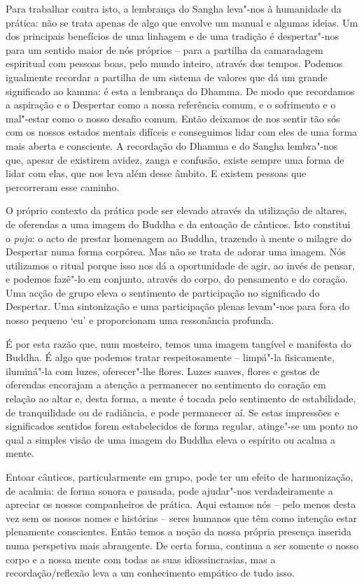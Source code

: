 Para trabalhar contra isto, a lembrança do Sangha leva"-nos à humanidade da
prática: não se trata apenas de algo que envolve um manual e algumas ideias. Um
dos principais benefícios de uma linhagem e de uma tradição é despertar"-nos para
um sentido maior de nós próprios -- para a partilha da camaradagem espiritual
com pessoas boas, pelo mundo inteiro, através dos tempos. Podemos igualmente
recordar a partilha de um sistema de valores que dá um grande significado ao
kamma: é esta a lembrança do Dhamma. De modo que recordamos a aspiração e o
Despertar como a nossa referência comum, e o sofrimento e o mal"-estar como o
nosso desafio comum. Então deixamos de nos sentir tão sós com os nossos estados
mentais difíceis e conseguimos lidar com eles de uma forma mais aberta e
consciente. A recordação do Dhamma e do Sangha lembra"-nos que, apesar de
existirem avidez, zanga e confusão, existe sempre uma forma de lidar com elas,
que nos leva além desse âmbito. E existem pessoas que percorreram esse caminho.

O próprio contexto da prática pode ser elevado através da utilização de altares,
de oferendas a uma imagem do Buddha e da entoação de cânticos. Isto constitui o
\emph{puja}: o acto de prestar homenagem ao Buddha, trazendo à mente o milagre
do Despertar numa forma corpórea. Mas não se trata de adorar uma imagem. Nós
utilizamos o ritual porque isso nos dá a oportunidade de agir, ao invés de
pensar, e podemos fazê"-lo em conjunto, através do corpo, do pensamento e do
coração. Uma acção de grupo eleva o sentimento de participação no significado do
Despertar. Uma sintonização e uma participação plenas levam"-nos para fora do
nosso pequeno `eu' e proporcionam uma ressonância profunda.

É por esta razão que, num mosteiro, temos uma imagem tangível e manifesta do
Buddha. É algo que podemos tratar respeitosamente -- limpá"-la fisicamente,
iluminá"-la com luzes, oferecer"-lhe flores. Luzes suaves, flores e gestos de
oferendas encorajam a atenção a permanecer no sentimento do coração em relação
ao altar e, desta forma, a mente é tocada pelo sentimento de estabilidade, de
tranquilidade ou de radiância, e pode permanecer aí. Se estas impressões e
significados sentidos forem estabelecidos de forma regular, atinge"-se um ponto
no qual a simples visão de uma imagem do Buddha eleva o espírito ou acalma a
mente.

Entoar cânticos, particularmente em grupo, pode ter um efeito de harmonização,
de acalmia: de forma sonora e pausada, pode ajudar"-nos verdadeiramente a
apreciar os nossos companheiros de prática. Aqui estamos nós -- pelo menos desta
vez sem os nossos nomes e histórias -- seres humanos que têm como intenção estar
plenamente conscientes. Então temos a noção da nossa própria presença inserida
numa perspetiva mais abrangente. De certa forma, continua a ser somente o nosso
corpo e a nossa mente com todas as suas idiossincrasias, mas a
recordação/reflexão leva a um conhecimento empático de tudo isso.

